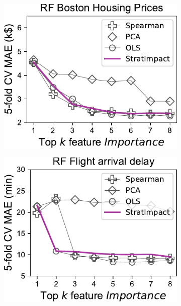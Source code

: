 \documentclass[11pt]{article}
\begin{document}
\begin{figure}
\centering
\begin{subfigure}{.245\textwidth}
    \centering
\includegraphics[scale=0.45]{images/boston-topk-baseline-Importance.pdf}
\subcaption{}
\end{subfigure}%
\begin{subfigure}{.245\textwidth}
    \centering
\includegraphics[scale=0.45]{images/flights-topk-baseline-Importance.pdf}
\subcaption{}
\end{subfigure}
\begin{subfigure}{.245\textwidth}
    \centering

\end{subfigure}
\end{figure}
\end{document}
